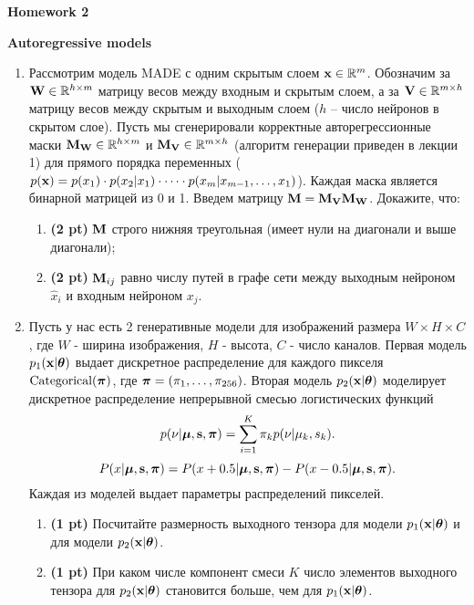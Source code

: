 \documentclass{article}
\begin{document}
\begin{center}
    {\Large \textbf{Homework 2}} \\
\end{center}

{\large \textbf{Autoregressive models}}
\begin{enumerate}
    \item Рассмотрим модель MADE с одним скрытым слоем $\mathbf{x} \in \mathbb{R}^m$. Обозначим за $\mathbf{W} \in \mathbb{R}^{h \times m}$ матрицу весов между входным и скрытым слоем, а за $\mathbf{V} \in \mathbb{R}^{m \times h}$ матрицу весов между скрытым и выходным слоем ($h$ -- число нейронов в скрытом слое). Пусть мы сгенерировали корректные авторегрессионные маски $\mathbf{M}_{\mathbf{W}} \in \mathbb{R}^{h \times m}$ и $\mathbf{M}_{\mathbf{V}} \in \mathbb{R}^{m \times h}$ (алгоритм генерации приведен в лекции 1) для прямого порядка переменных ($p(\mathbf{x}) = p(x_1) \cdot p(x_2 | x_1) \cdot \dots \cdot p(x_m | x_{m-1}, \dots, x_1)$). Каждая маска является бинарной матрицей из 0 и 1. Введем матрицу $\mathbf{M} = \mathbf{M}_{\mathbf{V}} \mathbf{M}_{\mathbf{W}}$. Докажите, что:
    \begin{enumerate}
    	\item  \textbf{(2 pt)} $\mathbf{M}$ строго нижняя треугольная (имеет нули на диагонали и выше диагонали);
    	\item  \textbf{(2 pt)} $\mathbf{M}_{ij}$ равно числу путей в графе сети между выходным нейроном $\hat{x}_i$ и входным нейроном $x_j$.
    \end{enumerate}
    \item Пусть у нас есть 2 генеративные модели для изображений размера $W \times H \times C$, где $W$ - ширина изображения, $H$ - высота, $C$ - число каналов. Первая модель $p_1(\mathbf{x} | \boldsymbol{\theta})$ выдает дискретное распределение для каждого пикселя $\text{Categorical}(\boldsymbol{\pi})$, где $\boldsymbol{\pi} = (\pi_1, \dots,  \pi_{256})$. Вторая модель $p_2(\mathbf{x} | \boldsymbol{\theta})$ моделирует дискретное распределение непрерывной смесью логистических функций
   		\[
  				p(\nu | \boldsymbol{\mu}, \mathbf{s}, \boldsymbol{\pi}) = \sum_{i=1}^K \pi_k p(\nu | \mu_k, s_k).
		\]
    	\[
    		P(x | \boldsymbol{\mu}, \mathbf{s}, \boldsymbol{\pi}) = P(x + 0.5 | \boldsymbol{\mu}, \mathbf{s}, \boldsymbol{\pi}) - P(x - 0.5 | \boldsymbol{\mu}, \mathbf{s}, \boldsymbol{\pi}).
    	\]
    Каждая из моделей выдает параметры распределений пикселей.
    	\begin{enumerate}
    		\item \textbf{(1 pt)} Посчитайте размерность выходного тензора для модели $p_1(\mathbf{x} | \boldsymbol{\theta})$ и для модели $p_2(\mathbf{x} | \boldsymbol{\theta})$. 
    		\item \textbf{(1 pt)} При каком числе компонент смеси $K$ число элементов выходного тензора для $p_2(\mathbf{x} | \boldsymbol{\theta})$ становится больше, чем для $p_1(\mathbf{x} | \boldsymbol{\theta})$.
    	\end{enumerate}
\end{enumerate}
\end{document}
